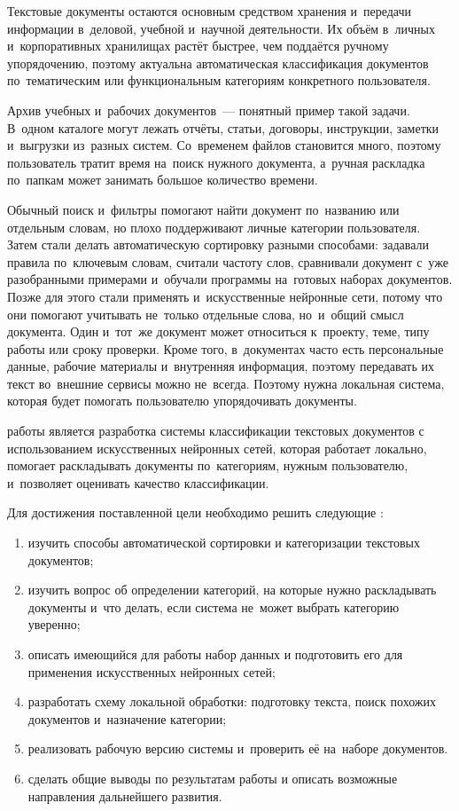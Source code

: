 Текстовые документы остаются основным средством хранения
и~передачи информации в~деловой, учебной и~научной деятельности. Их объём
в~личных и~корпоративных хранилищах растёт быстрее, чем поддаётся ручному
упорядочению, поэтому актуальна автоматическая классификация документов
по~тематическим или функциональным категориям конкретного пользователя.

Архив учебных и~рабочих документов~--- понятный пример такой задачи. В~одном
каталоге могут лежать отчёты, статьи, договоры, инструкции, заметки
и~выгрузки из~разных систем. Со~временем файлов становится много, поэтому
пользователь тратит время на~поиск нужного документа, а~ручная раскладка
по~папкам может занимать большое количество времени.

Обычный поиск и~фильтры помогают найти документ по~названию или отдельным
словам, но плохо поддерживают личные категории пользователя. Затем
стали делать автоматическую сортировку разными способами: задавали правила
по~ключевым словам, считали частоту слов, сравнивали документ с~уже
разобранными примерами и~обучали программы на~готовых наборах документов.
Позже для этого стали применять и~искусственные нейронные сети, потому что они
помогают учитывать не~только отдельные слова, но~и~общий смысл документа.
Один и~тот~же документ может относиться к~проекту, теме, типу работы или сроку
проверки. Кроме того, в~документах часто есть персональные данные, рабочие
материалы и~внутренняя информация, поэтому передавать их текст во~внешние
сервисы можно не~всегда. Поэтому нужна локальная система, которая будет
помогать пользователю упорядочивать документы.

{\aim} работы является разработка системы классификации текстовых документов
с использованием искусственных нейронных сетей, которая работает локально,
помогает раскладывать документы по~категориям,
нужным пользователю, и~позволяет оценивать качество классификации.

Для достижения поставленной цели необходимо решить следующие {\tasks}:
\begin{enumerate}[beginpenalty=10000]
  \item изучить способы автоматической сортировки и категоризации текстовых документов;
  \item изучить вопрос об определении категорий, на которые нужно раскладывать документы и~что делать,
        если система не~может выбрать категорию уверенно;
  \item описать имеющийся для работы набор данных и подготовить его для применения искусственных нейронных сетей;
  \item разработать схему локальной обработки: подготовку текста, поиск похожих
        документов и~назначение категории;
  \item реализовать рабочую версию системы и~проверить её на~наборе документов.
  \item сделать общие выводы по результатам работы и описать возможные направления
        дальнейшего развития.
\end{enumerate}

